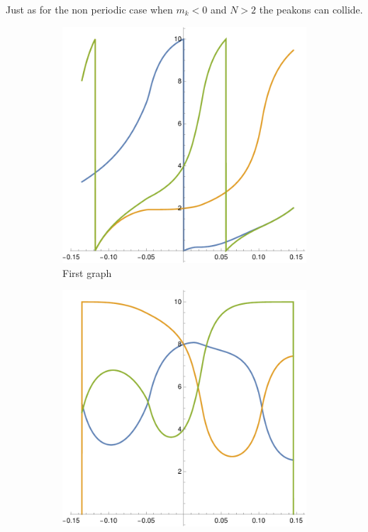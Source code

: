 \documentclass[english,master]{liumaiex}
\theoremstyle{plain}
\theoremstyle{definition}
\begin{document}
Just as for the non periodic case when $m_k < 0$ and $N > 2$ the peakons can collide.
\begin{figure}[H]
	\begin{subfigure}{0.3\textwidth}
        \includegraphics[width=\textwidth]{graphs/perCollision/x.pdf}
        \caption{First graph}
    \end{subfigure}
	\hfill
	\begin{subfigure}{0.3\textwidth}
        \includegraphics[width=\textwidth]{graphs/perCollision/xDist.pdf}

\end{subfigure}
\end{figure}
\end{document}

